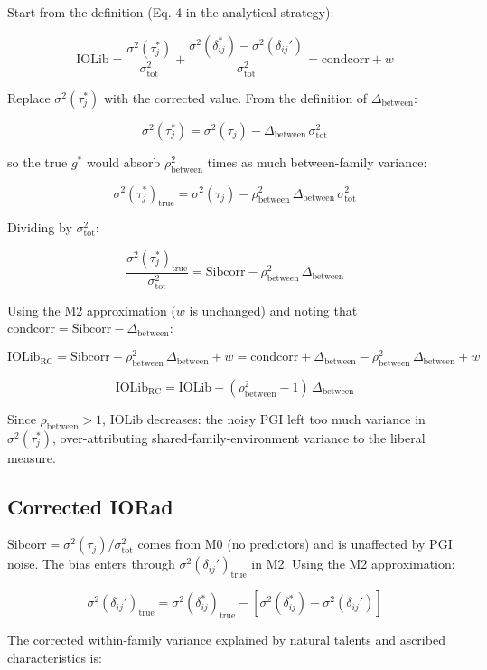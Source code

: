 \documentclass[
]{article}
\begin{document}
Start from the definition (Eq. 4 in the analytical strategy):

\[\text{IOLib} = \frac{\sigma^2(\tau_j^*)}{\sigma^2_\text{tot}} + \frac{\sigma^2(\delta_{ij}^*) - \sigma^2(\delta_{ij}')}{\sigma^2_\text{tot}} = \text{condcorr} + w\]

Replace \(\sigma^2(\tau_j^*)\) with the corrected value. From the
definition of \(\Delta_\text{between}\):

\[\sigma^2(\tau_j^*) = \sigma^2(\tau_j) - \Delta_\text{between}\,\sigma^2_\text{tot}\]

so the true \(g^*\) would absorb \(\rho^2_\text{between}\) times as much
between-family variance:

\[\sigma^2(\tau_j^*)_\text{true} = \sigma^2(\tau_j) - \rho^2_\text{between}\,\Delta_\text{between}\,\sigma^2_\text{tot}\]

Dividing by \(\sigma^2_\text{tot}\):

\[\frac{\sigma^2(\tau_j^*)_\text{true}}{\sigma^2_\text{tot}} = \text{Sibcorr} - \rho^2_\text{between}\,\Delta_\text{between}\]

Using the M2 approximation (\(w\) is unchanged) and noting that
\(\text{condcorr} = \text{Sibcorr} - \Delta_\text{between}\):

\[\text{IOLib}_\text{RC} = \text{Sibcorr} - \rho^2_\text{between}\,\Delta_\text{between} + w = \text{condcorr} + \Delta_\text{between} - \rho^2_\text{between}\,\Delta_\text{between} + w\]

\[\boxed{\text{IOLib}_\text{RC} = \text{IOLib} - (\rho^2_\text{between} - 1)\,\Delta_\text{between}}\]

Since \(\rho_\text{between} > 1\), IOLib decreases: the noisy PGI left
too much variance in \(\sigma^2(\tau_j^*)\), over-attributing
shared-family-environment variance to the liberal measure.


\subsection{Corrected IORad}\label{corrected-iorad}

\(\text{Sibcorr} = \sigma^2(\tau_j)/\sigma^2_\text{tot}\) comes from M0
(no predictors) and is unaffected by PGI noise. The bias enters through
\(\sigma^2(\delta_{ij}')_\text{true}\) in M2. Using the M2
approximation:

\[\sigma^2(\delta_{ij}')_\text{true} = \sigma^2(\delta_{ij}^*)_\text{true} - [\sigma^2(\delta_{ij}^*) - \sigma^2(\delta_{ij}')]\]

The corrected within-family variance explained by natural talents and
ascribed characteristics is:
\end{document}
